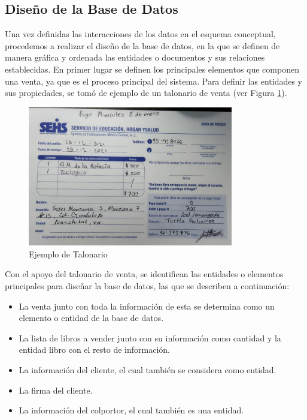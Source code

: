 \documentclass[runningheads]{llncs}
\begin{document}
            \subsection*{Diseño de la Base de Datos}
                Una vez definidas las interacciones de los datos en el esquema conceptual, procedemos a realizar el diseño de la base de datos, en la que se definen de manera gráfica y ordenada las entidades o documentos y sus relaciones establecidas.
                En primer lugar se definen los principales elementos que componen una venta, ya que es el proceso principal del sistema. Para definir las entidades y sus propiedades, se tomó de ejemplo de un talonario de venta (ver Figura \ref{fig6}).
                \begin{figure}[H]
                    \centering\captionsetup{width=0.8\textwidth}
                    \includegraphics[width=0.8\textwidth]{figures/db_diagrams/talonario.png}
                    \caption{Ejemplo de Talonario} \label{fig6}
                \end{figure}
                Con el apoyo del talonario de venta, se identifican las entidades o elementos principales para diseñar la base de datos, las que se describen a continuación:
                \begin{itemize}
                    \item La venta junto con toda la información de esta se determina como un elemento o entidad de la base de datos.
                    \item La lista de libros a vender junto con su información como cantidad y la entidad libro con el resto de información.
                    \item La información del cliente, el cual también se considera como entidad.
                    \item La firma del cliente.
                    \item La información del colportor, el cual también es una entidad.
                \end{itemize}
\end{document}
